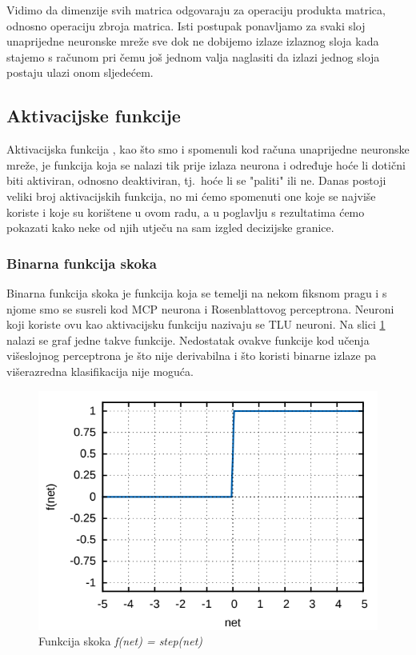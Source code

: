 \documentclass[times, utf8, zavrsni]{fer}
\begin{document}
Vidimo da dimenzije svih matrica odgovaraju za operaciju produkta matrica, odnosno operaciju zbroja matrica. Isti postupak ponavljamo za svaki sloj unaprijedne neuronske mreže sve dok ne dobijemo izlaze izlaznog sloja kada stajemo s računom pri čemu još jednom valja naglasiti da izlazi jednog sloja postaju ulazi onom sljedećem.

\subsection{Aktivacijske funkcije}
Aktivacijska funkcija , kao što smo i spomenuli kod računa unaprijedne neuronske mreže, je funkcija koja se nalazi tik prije izlaza neurona i određuje hoće li dotični biti aktiviran, odnosno deaktiviran, tj.\ hoće li se "paliti" ili ne. Danas postoji veliki broj aktivacijskih funkcija, no mi ćemo spomenuti one koje se najviše koriste i koje su korištene u ovom radu, a u poglavlju s rezultatima ćemo pokazati kako neke od njih utječu na sam izgled decizijske granice.

\subsubsection{Binarna funkcija skoka}
Binarna funkcija skoka  je funkcija koja se temelji na nekom fiksnom pragu i s njome smo se susreli kod MCP neurona i Rosenblattovog perceptrona. Neuroni koji koriste ovu kao aktivacijsku funkciju nazivaju se TLU  neuroni. Na slici \ref{fig:step-fun} nalazi se graf jedne takve funkcije. Nedostatak ovakve funkcije kod učenja višeslojnog perceptrona je što nije derivabilna i što koristi binarne izlaze pa višerazredna klasifikacija nije moguća. 

\begin{figure}[H]
    \centering
    \includegraphics[scale=0.5]{img/step-fun.png}
    \caption[Caption for LOF]{Funkcija skoka \textit{f(net) = step(net)}\footnotemark}
    \label{fig:step-fun}
\end{figure}
\end{document}
